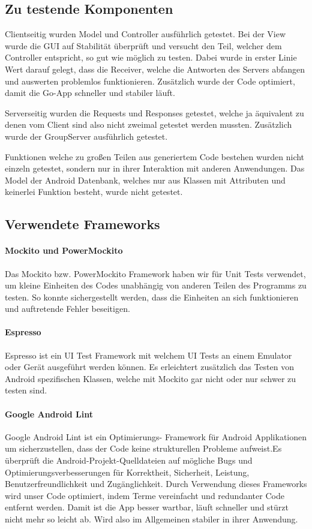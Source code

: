 \subsection{Zu testende Komponenten}

	Clientseitig wurden Model und Controller ausführlich getestet. Bei der View wurde die GUI auf Stabilität überprüft und versucht den Teil, welcher dem Controller entspricht, so gut wie möglich zu testen. Dabei wurde in erster Linie Wert darauf gelegt, dass die Receiver, welche die Antworten des Servers abfangen und auswerten problemlos funktionieren. Zusätzlich wurde der Code optimiert, damit die Go-App schneller und stabiler läuft.

	Serverseitig wurden die Requests und Responses getestet, welche ja äquivalent zu denen vom Client sind also nicht zweimal getestet werden mussten. Zusätzlich wurde der GroupServer ausführlich getestet.

	Funktionen welche zu großen Teilen aus generiertem Code bestehen wurden nicht einzeln getestet, sondern nur in ihrer Interaktion mit anderen Anwendungen.
	Das Model der Android Datenbank, welches nur aus Klassen mit Attributen und keinerlei Funktion besteht, wurde nicht getestet. 

\subsection{Verwendete Frameworks}
	\paragraph{Mockito und PowerMockito}
	Das Mockito bzw. PowerMockito Framework haben wir für Unit Tests verwendet, um kleine Einheiten des Codes unabhängig von anderen Teilen des Programms zu testen. So konnte sichergestellt werden, dass die Einheiten an sich funktionieren und auftretende Fehler beseitigen.

	\paragraph{Espresso}
	Espresso ist ein UI Test Framework mit welchem UI Tests an einem Emulator oder Gerät ausgeführt werden können. Es erleichtert zusätzlich das Testen von Android spezifischen Klassen, welche mit Mockito gar nicht oder nur schwer zu testen sind.
	
	\paragraph{Google Android Lint}
	Google Android Lint ist ein Optimierungs- Framework für Android Applikationen um sicherzustellen, dass der Code keine strukturellen Probleme aufweist.Es überprüft die Android-Projekt-Quelldateien auf mögliche Bugs und Optimierungsverbesserungen für Korrektheit, Sicherheit, Leistung, Benutzerfreundlichkeit und Zugänglichkeit.
	Durch Verwendung dieses Frameworks wird unser Code optimiert, indem Terme vereinfacht und redundanter Code entfernt werden. Damit ist die App besser wartbar, läuft schneller und stürzt nicht mehr so leicht ab. Wird also im Allgemeinen stabiler in ihrer Anwendung.
	

